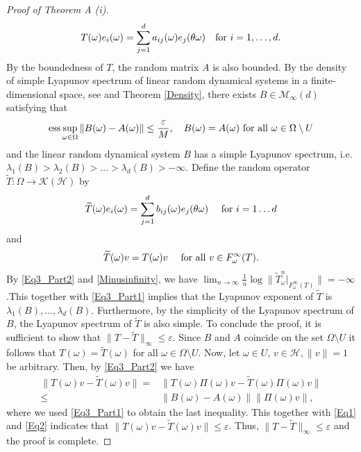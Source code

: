 \documentclass[pdflatex,sn-mathphys-num]{sn-jnl}%
\theoremstyle{thmstyleone}%
\theoremstyle{thmstyletwo}%
\theoremstyle{thmstylethree}%
\newcommand{\eps}{\varepsilon}
\numberwithin{equation}{section}
\begin{document}
\begin{proof}[Proof of Theorem A (i)]
\[
T(\omega) e_i(\omega)=\sum_{j=1}^{d} a_{ij}(\omega) e_j(\theta\omega)\quad\hbox{for } i=1,\dots,d.
\]
By the boundedness of $T$, the random matrix $A$ is also bounded. By the density of simple Lyapunov spectrum of linear random dynamical systems in a finite-dimensional space, see \cite{Knill92,Arnold_Cong_1999} and Theorem \ref{Density}, there exists $B\in\mathcal M_{\infty}(d)$ satisfying that
\begin{equation}\label{Eq2}
\mbox{ess}\sup_{\omega\in\Omega}\|B(\omega)-A(\omega)\|\leq \frac{\eps}{M},\quad B(\omega)=A(\omega)\hbox{ for all } \omega\in\Omega\setminus U
\end{equation}
and the linear random dynamical system $B$ has a simple Lyapunov spectrum, i.e. $\lambda_1(B)>\lambda_2(B)>\dots>\lambda_d(B)>-\infty$. Define the random operator $\widetilde T:\Omega\rightarrow \mathcal K(\mathcal H)$ by
\begin{equation}\label{Eq3_Part1}
\widetilde T(\omega) e_i(\omega)=\sum_{j=1}^{d} b_{ij}(\omega) e_j(\theta\omega)\quad\hbox{ for } i=1\dots d
\end{equation}
and 
\begin{equation}\label{Eq3_Part2}
\widetilde T(\omega)v=T(\omega)v\quad\hbox{ for all } v\in F_{\omega}^{\infty}(T).
\end{equation}
By \eqref{Eq3_Part2} and \eqref{Minusinfinity}, we have $	\lim_{n\to\infty}\frac{1}{n}\log\|\widetilde T^n_{\omega}|_{F_{\omega}^{\infty}(T)}\|=
		-\infty$.This together with \eqref{Eq3_Part1} implies that the Lyapunov exponent of $\widetilde T$ is $\lambda_1(B),\dots,\lambda_d(B)$. Furthermore, by the simplicity of the Lyapunov spectrum of $B$, the Lyapunov spectrum of $\widetilde T$ is also simple. To conclude the proof, it is sufficient to show that $\|T-\widetilde T\|_{\infty}\leq \eps$. Since $B$ and $A$ coincide on the set $\Omega\setminus U$ it follows that $T(\omega)=\widetilde T(\omega)$ for all $\omega\in \Omega\setminus U$. Now, let $\omega\in U$,  $v\in \mathcal H, \|v\|=1$ be arbitrary. Then, by \eqref{Eq3_Part2} we have 
		\begin{align*}
		\|T(\omega)v-\widetilde T(\omega)v\|=&\|T(\omega)\Pi(\omega)v-\widetilde T(\omega)\Pi(\omega)v\|\\[1ex]
		\leq& \|B(\omega)-A(\omega)\|\|\Pi(\omega)v\|,
		\end{align*}
where we used \eqref{Eq3_Part1} to obtain the last inequality.  This together with \eqref{Eq1} and \eqref{Eq2} indicates that $\|T(\omega)v-\widetilde T(\omega)v\|\leq \eps$. Thus,  $\|T-\widetilde T\|_{\infty}\leq \eps$ and the proof is complete.
\end{proof}
%
%
%
\end{document}
